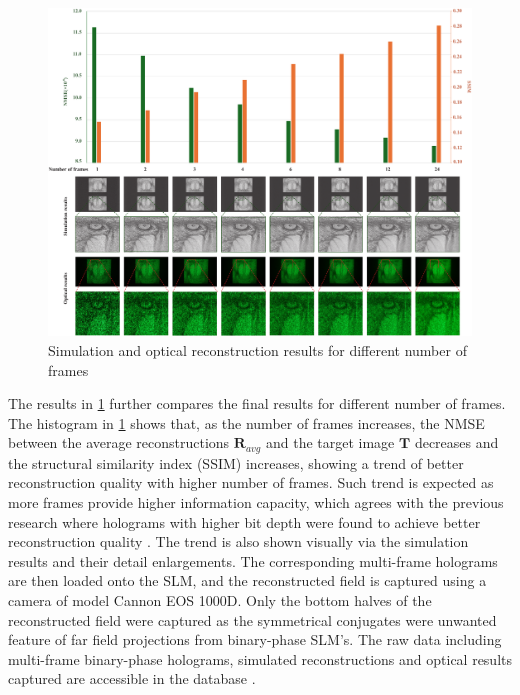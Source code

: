 	\begin{figure}[h!t]
		\centering
		\includegraphics[width=1.0\textwidth]{recon_quality_vs_num_frames.pdf}
		\caption{Simulation and optical reconstruction results for different number of frames}
		\label{fig:recon_quality_vs_num_frames}
	\end{figure}
	
	The results in \cref{fig:recon_quality_vs_num_frames} further compares the final results for different number of frames. The histogram in \cref{fig:recon_quality_vs_num_frames} shows that, as the number of frames increases, the NMSE between the average reconstructions $\textbf{R}_{avg}$ and the target image $\textbf{T}$ decreases and the structural similarity index (SSIM)\cite{Wang2004_SSIM} increases, showing a trend of better reconstruction quality with higher number of frames. Such trend is expected as more frames provide higher information capacity, which agrees with the previous research where holograms with higher bit depth were found to achieve better reconstruction quality \cite{Sha2024}. The trend is also shown visually via the simulation results and their detail enlargements. The corresponding multi-frame holograms are then loaded onto the SLM, and the reconstructed field is captured using a camera of model Cannon EOS 1000D. Only the bottom halves of the reconstructed field were captured as the symmetrical conjugates were unwanted feature of far field projections from binary-phase SLM's. The raw data including multi-frame binary-phase holograms, simulated reconstructions and optical results captured are accessible in the database \cite{research_data_MFHO2024}.
	
